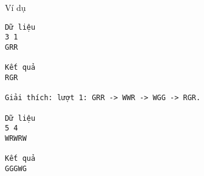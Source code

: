 Ví dụ
\begin{verbatim}
Dữ liệu
3 1
GRR

Kết quả 
RGR

Giải thích: lượt 1: GRR -> WWR -> WGG -> RGR.

Dữ liệu
5 4
WRWRW

Kết quả 
GGGWG
\end{verbatim}